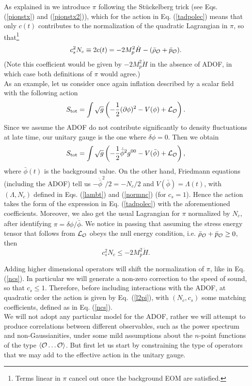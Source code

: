 \documentclass[11pt,amsmath,floats,floatfix,nofootinbib,secnumarabic, superscriptaddress, tightenlines]{revtex4}
\newcommand{\beq}{\begin{equation}}
\newcommand{\eeq}{\end{equation}}
\newcommand{\calo}{{\cal O}}
\newcommand{\calL}{{\cal L}}
\newcommand{\bphi}{{\bar\phi}}
\begin{document}
{As explained in \cite{eft1} we introduce $\pi$ following the St\"uckelberg trick (see Eqs. (\ref{pionstx}) and (\ref{pionstx2})), which for the action in Eq. (\ref{tadpolec}) means that only $c(t)$ contributes to the normalization of the quadratic Lagrangian in $\pi$, so that\footnote{Terms linear in $\pi$ cancel out once the background EOM are satisfied.}
\beq\label{normnc}
c_s^2N_c \equiv 2c(t) = -2M_p^2\dot H -(\bar \rho_\calo +\bar p_\calo).
\eeq
(Note this coefficient would be given by $-2M_p^2\dot H$ in the absence of ADOF, in which case both definitions of $\pi$ would agree.)\\

As an example, let us consider once again inflation described by a scalar field with the following action 
\beq
S_{\rm tot} = \int \sqrt{g} \left(-\frac{1}{2}(\partial\phi)^2-V(\phi) + \calL_\calo\right).
\eeq
Since we assume the ADOF do not contribute significantly to density fluctuations at late time, our unitary gauge is the one where $\delta\phi=0$. Then we obtain
\beq
S_{\rm tot} = \int \sqrt{g} \left(-\frac{1}{2}\dot\bphi^2g^{00}-V(\bphi) + \calL_\calo\right),
\eeq
where $\bphi(t)$ is the background value. On the other hand, Friedmann equations (including the ADOF) tell us
$-\dot\bphi^2/2 = -N_c/2$ and $V(\bphi) = \Lambda(t)$, with $(\Lambda, N_c)$ defined in Eqs. (\ref{lambt}) and (\ref{normnc}) (for $c_s=1$).
Hence the action takes the form of the expression in Eq. (\ref{tadpolec}) with the aforementioned coefficients. Moreover, we also get the usual  Lagrangian for $\pi$ normalized by $N_c$, after identifying $\pi = \delta\phi/\dot\bphi$. We notice in passing that assuming the stress energy tensor that follows from $\calL_\calo$ obeys the null energy condition, i.e. $\bar\rho_\calo+\bar p_\calo \geq 0$, then \beq \label{foot18} c_s^2N_c \leq  -2M_p^2\dot H.\eeq

Adding higher dimensional operators will shift the normalization of $\pi$, like in Eq. (\ref{ncs}). In particular we will generate a non-zero correction to the speed of sound, so that $c_s \leq 1$. Therefore, before including interactions with the ADOF, at quadratic order the action is given by Eq.~(\ref{l2pi}), with $(N_c, c_s)$ some matching coefficients, defined as in Eq. (\ref{ncs}).\\

We will not adopt any particular model for the ADOF, rather we will attempt to produce correlations between different observables, such as the power spectrum and non-Gaussianities, under some mild assumptions about the $n$-point functions of the type $\langle \calo\ldots \calo\rangle$. But first let us start by constraining the type of operators that we may add to the effective action in the unitary gauge.

}
\end{document}
